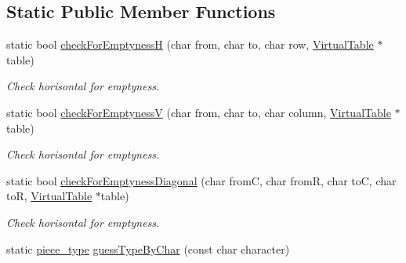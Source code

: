 \subsection*{Static Public Member Functions}
\begin{DoxyCompactItemize}
\item 
static bool \hyperlink{classChEngn_1_1Engine_aebba3d5fac90f1e829fc122b31f26064}{checkForEmptynessH} (char from, char to, char row, \hyperlink{classChEngn_1_1Table}{VirtualTable} $\ast$table)
\begin{DoxyCompactList}\small\item\em Check horisontal for emptyness. \item\end{DoxyCompactList}\item 
static bool \hyperlink{classChEngn_1_1Engine_ab812e459beb68c21e02370d0f7767299}{checkForEmptynessV} (char from, char to, char column, \hyperlink{classChEngn_1_1Table}{VirtualTable} $\ast$table)
\begin{DoxyCompactList}\small\item\em Check horisontal for emptyness. \item\end{DoxyCompactList}\item 
static bool \hyperlink{classChEngn_1_1Engine_afa008c74a0a46fc1dacd41ad2d8210e2}{checkForEmptynessDiagonal} (char fromC, char fromR, char toC, char toR, \hyperlink{classChEngn_1_1Table}{VirtualTable} $\ast$table)
\begin{DoxyCompactList}\small\item\em Check horisontal for emptyness. \item\end{DoxyCompactList}\item 
static \hyperlink{namespaceChEngn_a2a35c185f259757a78e937575b8ed483}{piece\_\-type} \hyperlink{classChEngn_1_1Engine_a57cb976b2427ba1da47365424de049e2}{guessTypeByChar} (const char character)
\end{DoxyCompactItemize}
